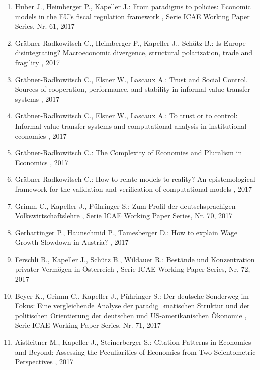 \begin{enumerate}[leftmargin=*, labelsep=0.5cm]
	 \item Huber J., Heimberger P., Kapeller J.:  From paradigms to policies: Economic models in the EU’s fiscal regulation framework  , Serie ICAE Working Paper Series, Nr. 61, 2017
	 \item Gräbner-Radkowitsch C., Heimberger P., Kapeller J., Schütz B.:  Is Europe disintegrating? Macroeconomic divergence, structural polarization, trade and fragility  , 2017
	 \item Gräbner-Radkowitsch C., Elsner W., Lascaux A.:  Trust and Social Control. Sources of cooperation, performance, and stability in informal value transfer systems  , 2017
	 \item Gräbner-Radkowitsch C., Elsner W., Lascaux A.:  To trust or to control: Informal value transfer systems and computational analysis in institutional economics  , 2017
	 \item Gräbner-Radkowitsch C.:  The Complexity of Economies and Pluralism in Economics  , 2017
	 \item Gräbner-Radkowitsch C.:  How to relate models to reality? An epistemological framework for the validation and verification of computational models  , 2017
	 \item Grimm C., Kapeller J., Pühringer S.:  Zum Profil der deutschsprachigen Volkswirtschaftslehre  , Serie ICAE Working Paper Series, Nr. 70, 2017
	 \item Gerhartinger P., Haunschmid P., Tamesberger D.:  How to explain Wage Growth Slowdown in Austria?  , 2017
	 \item Ferschli B., Kapeller J., Schütz B., Wildauer R.:  Bestände und Konzentration privater Vermögen in Österreich  , Serie ICAE Working Paper Series, Nr. 72, 2017
	 \item Beyer K., Grimm C., Kapeller J., Pühringer S.:  Der deutsche Sonderweg im Fokus: Eine vergleichende Analyse der paradig¬matischen Struktur und der politischen Orientierung der deutschen und US-amerikanischen Ökonomie  , Serie ICAE Working Paper Series, Nr. 71, 2017
	 \item Aistleitner M., Kapeller J., Steinerberger S.:  Citation Patterns in Economics and Beyond: Assessing the Peculiarities of Economics from Two Scientometric Perspectives  , 2017
\end{enumerate} 
